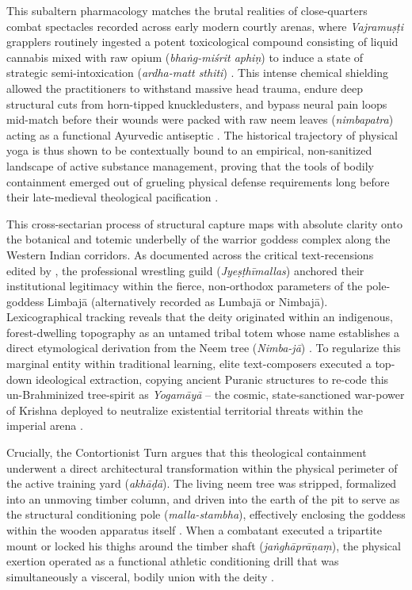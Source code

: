 \documentclass[11pt,twoside,letterpaper]{article}
\begin{document}
This subaltern pharmacology matches the brutal realities of close-quarters combat spectacles recorded across early modern courtly arenas, where \textit{Vajramuṣṭi} grapplers routinely ingested a potent toxicological compound consisting of liquid cannabis mixed with raw opium (\textit{bhaṅg-miśrit aphiṇ}) to induce a state of strategic semi-intoxication (\textit{ardha-matt sthiti}) \citep{Sandesara1948}. This intense chemical shielding allowed the practitioners to withstand massive head trauma, endure deep structural cuts from horn-tipped knuckledusters, and bypass neural pain loops mid-match before their wounds were packed with raw neem leaves (\textit{nimbapatra}) acting as a functional Ayurvedic antiseptic \citep{Sandesara1948}. The historical trajectory of physical yoga is thus shown to be contextually bound to an empirical, non-sanitized landscape of active substance management, proving that the tools of bodily containment emerged out of grueling physical defense requirements long before their late-medieval theological pacification \citep{Sandesara1948, Wujastyk2025}.

This cross-sectarian process of structural capture maps with absolute clarity onto the botanical and totemic underbelly of the warrior goddess complex along the Western Indian corridors. As documented across the critical text-recensions edited by \citet{MP_7}, the professional wrestling guild (\textit{Jyeṣṭhīmallas}) anchored their institutional legitimacy within the fierce, non-orthodox parameters of the pole-goddess Limbajā (alternatively recorded as Lumbajā or Nimbajā). Lexicographical tracking reveals that the deity originated within an indigenous, forest-dwelling topography as an untamed tribal totem whose name establishes a direct etymological derivation from the Neem tree (\textit{Nimba-jā}) \citep{Abbasi2001, Sandesara1948}. To regularize this marginal entity within traditional learning, elite text-composers executed a top-down ideological extraction, copying ancient Puranic structures to re-code this un-Brahminized tree-spirit as \textit{Yogamāyā} -- the cosmic, state-sanctioned war-power of Krishna deployed to neutralize existential territorial threats within the imperial arena \citep{Das1968, Sandesara1948}.

Crucially, the Contortionist Turn argues that this theological containment underwent a direct architectural transformation within the physical perimeter of the active training yard (\textit{akhāḍā}). The living neem tree was stripped, formalized into an unmoving timber column, and driven into the earth of the pit to serve as the structural conditioning pole (\textit{malla-stambha}), effectively enclosing the goddess within the wooden apparatus itself \citep{MP_7, Khasgivale1929}. When a combatant executed a tripartite mount or locked his thighs around the timber shaft (\textit{jaṅghāprāṇaṃ}), the physical exertion operated as a functional athletic conditioning drill that was simultaneously a visceral, bodily union with the deity \citep{MP_7}. 
\end{document}
